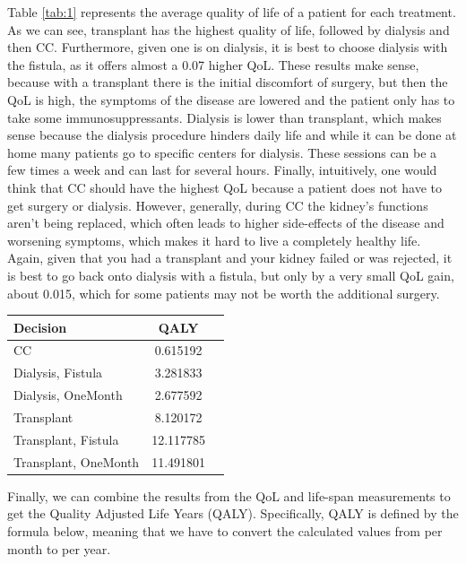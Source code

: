 \documentclass[10pt,twocolumn]{article}
\begin{document}
Table \ref{tab:1} represents the average quality of life of a patient for each treatment. As we can see, transplant has the highest quality of life, followed by dialysis and then CC. Furthermore, given one is on dialysis, it is best to choose dialysis with the fistula, as it offers almost a 0.07 higher QoL. These results make sense, because with a transplant there is the initial discomfort of surgery, but then the QoL is high, the symptoms of the disease are lowered and the patient only has to take some immunosuppressants. Dialysis is lower than transplant, which makes sense because the dialysis procedure hinders daily life and while it can be done at home many patients go to specific centers for dialysis. These sessions can be a few times a week and can last for several hours. Finally, intuitively, one would think that CC should have the highest QoL because a patient does not have to get surgery or dialysis. However, generally, during CC the kidney's functions aren't being replaced, which often leads to higher side-effects of the disease and worsening symptoms, which makes it hard to live a completely healthy life. Again, given that you had a transplant and your kidney failed or was rejected, it is best to go back onto dialysis with a fistula, but only by a very small QoL gain, about 0.015, which for some patients may not be worth the additional surgery.


\begin{center}
  \begin{tabularx}{\columnwidth}{X c c} 
  \toprule
  \textbf{Decision} & \textbf{QALY} \\
  \midrule
 CC & 0.615192 \\
 Dialysis, Fistula & 3.281833 \\
 Dialysis, OneMonth & 2.677592 \\
 Transplant & 8.120172 \\
 Transplant, Fistula & 12.117785 \\
 Transplant, OneMonth & 11.491801 \\
  \bottomrule
  \end{tabularx}
\end{center}

Finally, we can combine the results from the QoL and life-span measurements to get the Quality Adjusted Life Years (QALY). Specifically, QALY is defined by the formula below, meaning that we have to convert the calculated values from per month to per year.
\end{document}

